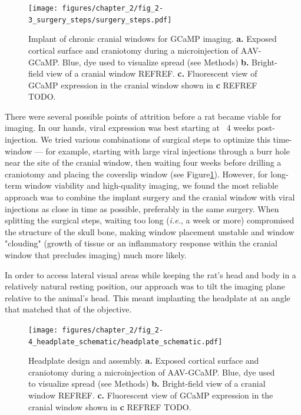 \begin{figure}
    \texttt{[image: figures/chapter\_2/fig\_2-3\_surgery\_steps/surgery\_steps.pdf]}
    \vspace{.1in}
    \caption[Chronic cranial window]{Implant of chronic cranial windows for GCaMP imaging. \textbf{a.} Exposed cortical surface and craniotomy during a microinjection of AAV-GCaMP. Blue, dye used to visualize spread (see Methods) \textbf{b.} Bright-field view of a cranial window REFREF. \textbf{c.} Fluorescent view of GCaMP expression in the cranial window shown in \textbf{c} REFREF TODO.
    \label{fig:surgery_steps}}
\end{figure}

There were several possible points of attrition before a rat became viable for imaging. In our hands, viral expression was best starting at ~4 weeks post-injection. We tried various combinations of surgical steps to optimize this time-window --- for example, starting with large viral injections through a burr hole near the site of the cranial window, then waiting four weeks before drilling a craniotomy and placing the coverslip window (see Figure\ref{fig:surgery_steps}). However, for long-term window viability and high-quality imaging, we found the most reliable approach was to combine the implant surgery and the cranial window with viral injections as close in time as possible, preferably in the same surgery. When splitting the surgical steps, waiting too long (\textit{i.e.}, a week or more) compromised the structure of the skull bone, making window placement unstable and window "clouding" (growth of tissue or an inflammatory response within the cranial window that precludes imaging) much more likely. 

In order to access lateral visual areas while keeping the rat’s head and body in a relatively natural resting position, our approach was to tilt the imaging plane relative to the animal’s head. This meant implanting the headplate at an angle that matched that of the objective. 

\begin{figure}
    \texttt{[image: figures/chapter\_2/fig\_2-4\_headplate\_schematic/headplate\_schematic.pdf]}
    \vspace{.1in}
    \caption[Headplate design and assembly]{Headplate design and assembly. \textbf{a.} Exposed cortical surface and craniotomy during a microinjection of AAV-GCaMP. Blue, dye used to visualize spread (see Methods) \textbf{b.} Bright-field view of a cranial window REFREF. \textbf{c.} Fluorescent view of GCaMP expression in the cranial window shown in \textbf{c} REFREF TODO.
    \label{fig:headplate_schematic}}
\end{figure}

